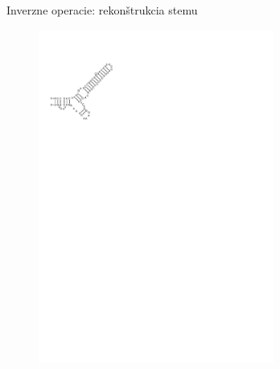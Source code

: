 \begin{figure}[H]
\begin{subfigure}{0.3\textwidth}
  \end{subfigure}
  \caption{Inverzne operacie: rekonštrukcia stemu}
  \label{obr:delete_insert_multibranch}
\end{figure}


\begin{figure}[H]
  \begin{subfigure}{0.3\textwidth}
    \includegraphics[clip, trim=1cm 21cm 14cm 2.5cm, width=0.85\textwidth]{../img/alg-insert/3/multibranch-beg}
  \end{subfigure}
  \begin{subfigure}{0.3\textwidth}

\end{subfigure}
\end{figure}
